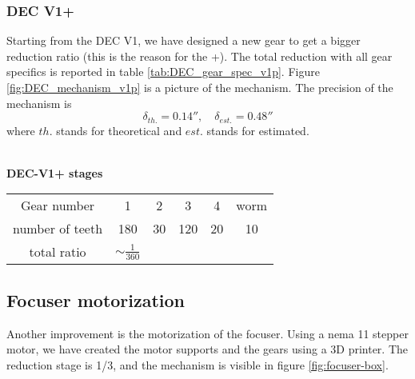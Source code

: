 \subsubsection{DEC V1+}
Starting from the DEC V1, we have designed a new gear to get a bigger reduction ratio (this is the reason for the +).
The total reduction with all gear specifics is reported in table \ref{tab:DEC_gear_spec_v1p}.
Figure \ref{fig:DEC_mechanism_v1p} is a picture of the mechanism.
The precision of the mechanism is 
\[\delta_{th.}=0.14'',\quad \delta_{est.}=0.48''\]
where \(th.\) stands for theoretical and \(est.\) stands for estimated.
\\
\\
\begin{minipage}
    {0.5\textwidth}
    \textbf{DEC-V1+ stages}\\
    \centering
    \begin{tabular}{cccccc}
        \hline
        Gear number & 1 & 2 & 3 & 4 & worm\\
        number of teeth & 180 & 30 & 120 & 20 & 10\\
        \hline
        total ratio & \(\sim \frac{1}{360}\) &&&
    \end{tabular}
    \label{tab:DEC_gear_spec_v1p}
\end{minipage}

\subsection{Focuser motorization}
Another improvement is the motorization of the focuser.
Using a nema 11 stepper motor, we have created the motor supports and the gears using a 3D printer.
The reduction stage is 1/3, and the mechanism is visible in figure \ref{fig:focuser-box}.
